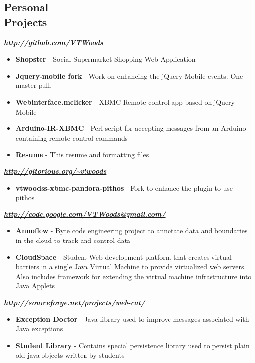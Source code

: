\documentclass[line,margin]{res}
\begin{document}
\begin{resume}
\section{Personal \\ Projects}
     \textbf{\emph{\url{http://github.com/VTWoods}}}
     \begin{itemize} \itemsep -2pt %
        \item \textbf{Shopster} - Social Supermarket Shopping Web Application
        \item \textbf{Jquery-mobile fork} - Work on enhancing the jQuery Mobile events. One master pull.
        \item \textbf{Webinterface.mclicker} - XBMC Remote control app based on jQuery Mobile 
        \item \textbf{Arduino-IR-XBMC} - Perl script for accepting messages from an Arduino containing remote control commands
        \item \textbf{Resume} - This resume and formatting files
     \end{itemize}
     \textbf{\emph{\url{http://gitorious.org/~vtwoods}}}
     \begin{itemize} \itemsep -2pt %
        \item \textbf{vtwoodss-xbmc-pandora-pithos} - Fork to enhance the plugin to use pithos
     \end{itemize}
     \textbf{\emph{\url{http://code.google.com/VTWoods@gmail.com/}}}
     \begin{itemize} \itemsep -2pt %
        \item \textbf{Annoflow} - Byte code engineering project to annotate data and boundaries in the cloud to track and control data
        \item \textbf{CloudSpace} - Student Web development platform that creates virtual barriers in
          a single Java Virtual Machine to provide virtualized web servers.  Also includes framework for extending the virtual machine
          infrastructure into Java Applets
     \end{itemize}
     \textbf{\emph{\url{http://sourceforge.net/projects/web-cat/}}}
     \begin{itemize} \itemsep -2pt %
        \item \textbf{Exception Doctor} - Java library used to improve messages associated with Java exceptions
        \item \textbf{Student Library} - Contains special persistence library used to persist plain old java objects written by students
     \end{itemize}


\end{resume}
\end{document}
